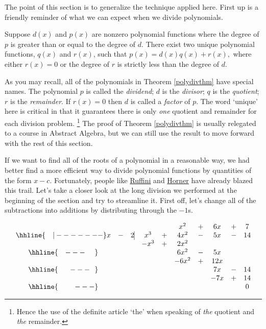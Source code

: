 \documentclass{ximera}
\begin{document}
The point of this section is to generalize the technique applied here.  First up is a friendly reminder of what we can expect when we divide polynomials. 

\begin{theorem}
    \label{polydivthm}
    Suppose $d(x)$ and $p(x)$ are nonzero polynomial functions where the degree of $p$ is greater than or equal to the degree of $d$.  There exist two unique polynomial functions, $q(x)$ and $r(x)$, such that $p(x) = d(x)  q(x) + r(x),$ where either $r(x) = 0$ or the degree of $r$ is strictly less than the degree of $d$. 
\end{theorem}

As you may recall, all of the polynomials in Theorem \ref{polydivthm} have special names.  The polynomial $p$ is called the  \emph{dividend}; $d$ is the  \emph{divisor}; $q$ is the  \emph{quotient}; $r$ is the  \emph{remainder}.  If $r(x)=0$ then $d$ is called a  \emph{factor} of $p$.  The word `unique' here is critical in that it guarantees there is only \textit{one} quotient and remainder for each division problem.%
\footnote{Hence the use of the definite article `the' when speaking of \textit{the} quotient and \textit{the} remainder.}
The proof of Theorem \ref{polydivthm} is usually relegated to a course in Abstract Algebra, but we can still use the result to move forward with the rest of this section.

If we want to find all of the roots of a polynomial in a reasonable way, we had better find a more efficient way to divide polynomial functions by quantities of the form $x-c$.  Fortunately, people like \href{http://en.wikipedia.org/wiki/Synthetic_division}{Ruffini} and \href{http://en.wikipedia.org/wiki/Horner_scheme}{Horner} have already blazed this trail.  Let's take a closer look at the long division we performed at the beginning of the section and try to streamline it.  First off, let's change all of the subtractions into additions by distributing through the $-1$s.


\setlength\arraycolsep{0.1pt}
\setlength\extrarowheight{2pt}

\[ 
\begin{array}{cccccccccc}
    & & & & & x^2 & + & 6x & + & 7 \\ \hhline{~~~|-------}
    x & - & 2  \vline& x^3 & + & 4x^2 & - & 5x & - & 14 \\
    &  &  &  -x^3  & + &   2x^2 &  &  &  &  \\ \hhline{~~~---~~~~} 
    &  &  &   &  & 6 x^2 & - & 5x &  &  \\ 
    &  &  &   & &-6 x^2  & + &  12x &  &  \\ \hhline{~~~~~---~~} 
    &  &  &   &   &  & & 7x  & - & 14 \\
    &  &  &   &   &  & & - 7x  & + &  14  \\ \hhline{~~~~~~~---} 
    &   &  &  &  &  &  &  &  & 0
\end{array}
\]
\end{document}
